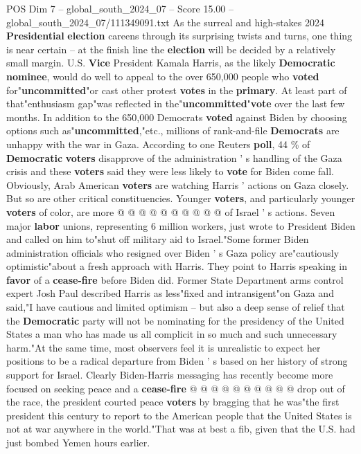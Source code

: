 \begin{textsample}{POS Dim 7 – global\_south\_2024\_07 – Score 15.00 – global\_south\_2024\_07/111349091.txt}  \label{ex:f7_pos_101}
As the surreal and high-stakes 2024 \textbf{Presidential} \textbf{election} careens through its surprising twists and turns, one thing is near certain -- at the finish line the \textbf{election} will be decided by a relatively small margin.
U.S. \textbf{Vice} President Kamala Harris, as the likely \textbf{Democratic} \textbf{nominee}, would do well to appeal to the over 650,000 people who \textbf{voted} for"\textbf{uncommitted}"or cast other protest \textbf{votes} in the \textbf{primary}.
At least part of that"enthusiasm gap"was reflected in the"\textbf{uncommitted}"\textbf{vote} over the last few months.
In addition to the 650,000 Democrats \textbf{voted} against Biden by choosing options such as"\textbf{uncommitted},"etc., millions of rank-and-file \textbf{Democrats} are unhappy with the war in Gaza.
According to one Reuters \textbf{poll}, 44 \% of \textbf{Democratic} \textbf{voters} disapprove of the administration ' s handling of the Gaza crisis and these \textbf{voters} said they were less likely to \textbf{vote} for Biden come fall.
Obviously, Arab American \textbf{voters} are watching Harris ' actions on Gaza closely.
But so are other critical constituencies.
Younger \textbf{voters}, and particularly younger \textbf{voters} of color, are more @ @ @ @ @ @ @ @ @ @ of Israel ' s actions.
Seven major \textbf{labor} unions, representing 6 million workers, just wrote to President Biden and called on him to"shut off military aid to Israel."Some former Biden administration officials who resigned over Biden ' s Gaza policy are"cautiously optimistic"about a fresh approach with Harris.
They point to Harris speaking in \textbf{favor} of a \textbf{cease-fire} before Biden did.
Former State Department arms control expert Josh Paul described Harris as less"fixed and intransigent"on Gaza and said,"I have cautious and limited optimism -- but also a deep sense of relief that the \textbf{Democratic} party will not be nominating for the presidency of the United States a man who has made us all complicit in so much and such unnecessary harm."At the same time, most observers feel it is unrealistic to expect her positions to be a radical departure from Biden ' s based on her history of strong support for Israel.
Clearly Biden-Harris messaging has recently become more focused on seeking peace and a \textbf{cease-fire} @ @ @ @ @ @ @ @ @ @ drop out of the race, the president courted peace \textbf{voters} by bragging that he was"the first president this century to report to the American people that the United States is not at war anywhere in the world."That was at best a fib, given that the U.S. had just bombed Yemen hours earlier.

\end{textsample}
